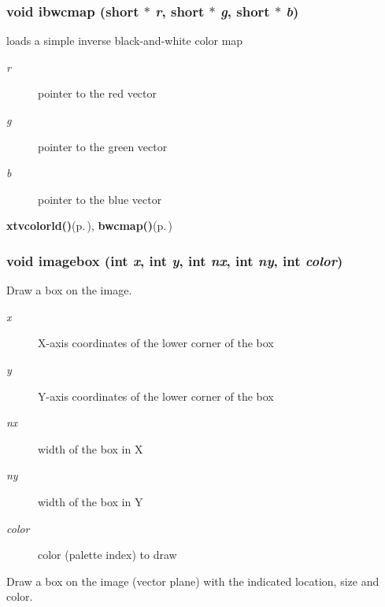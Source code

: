 \subsubsection{\setlength{\rightskip}{0pt plus 5cm}void ibwcmap (short $\ast$ {\em r}, short $\ast$ {\em g}, short $\ast$ {\em b})}\label{xtv_8h_a131}


loads a simple inverse black-and-white color map 

\begin{Desc}
\item[Parameters:]
\begin{description}
\item[{\em r}]pointer to the red vector \item[{\em g}]pointer to the green vector \item[{\em b}]pointer to the blue vector\end{description}
\end{Desc}
\begin{Desc}
\item[See also:]{\bf xtvcolorld()}{\rm (p.\,\pageref{xtv_8c_a6})}, {\bf bwcmap()}{\rm (p.\,\pageref{xtv_8c_a7})} \end{Desc}
\subsubsection{\setlength{\rightskip}{0pt plus 5cm}void imagebox (int {\em x}, int {\em y}, int {\em nx}, int {\em ny}, int {\em color})}\label{xtv_8h_a70}


Draw a box on the image. 

\begin{Desc}
\item[Parameters:]
\begin{description}
\item[{\em x}]X-axis coordinates of the lower corner of the box \item[{\em y}]Y-axis coordinates of the lower corner of the box \item[{\em nx}]width of the box in X \item[{\em ny}]width of the box in Y \item[{\em color}]color (palette index) to draw\end{description}
\end{Desc}
Draw a box on the image (vector plane) with the indicated location, size and color. 
